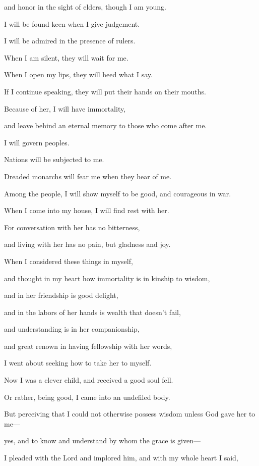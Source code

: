 {\par }{\QB and honor in the sight of elders, though I am young.
\par }{\Q {}I will be found keen when I give judgement.
\par }{\QB I will be admired in the presence of rulers.
\par }{\Q {}When I am silent, they will wait for me.
\par }{\QB When I open my lips, they will heed what I say.
\par }{\QB If I continue speaking, they will put their hands on their mouths.
\par }{\Q {}Because of her, I will have immortality,
\par }{\QB and leave behind an eternal memory to those who come after me.
\par }{\Q {}I will govern peoples.
\par }{\QB Nations will be subjected to me.
\par }{\Q {}Dreaded monarchs will fear me when they hear of me.
\par }{\QB Among the people, I will show myself to be good, and courageous in war.
\par }{\Q {}When I come into my house, I will find rest with her.
\par }{\QB For conversation with her has no bitterness,
\par }{\QB and living with her has no pain, but gladness and joy.
\par }{\Q {}When I considered these things in myself,
\par }{\QB and thought in my heart how immortality is in kinship to wisdom,
\par }{\Q {}and in her friendship is good delight,
\par }{\QB and in the labors of her hands is wealth that doesn’t fail,
\par }{\QB and understanding is in her companionship,
\par }{\QB and great renown in having fellowship with her words,
\par }{\QB I went about seeking how to take her to myself.
\par }{\Q {}Now I was a clever child, and received a good soul fell.
\par }{\QB {}Or rather, being good, I came into an undefiled body.
\par }{\Q {}But perceiving that I could not otherwise possess wisdom unless God gave her to me—
\par }{\QB yes, and to know and understand by whom the grace is given—
\par }{\QB I pleaded with the Lord and implored him, and with my whole heart I said,

}
